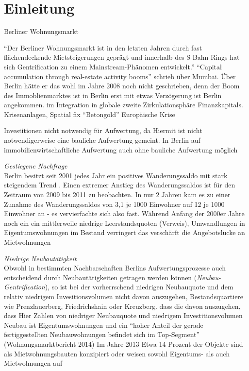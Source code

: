 \section{Einleitung}
 Berliner Wohnungsmarkt

"`Der Berliner Wohnungsmarkt ist in den letzten Jahren durch fast flächendeckende Mietsteigerungen geprägt und innerhalb des S-Bahn-Rings hat sich Gentrification zu einem Mainstream-Phänomen entwickelt."' \citep[S.~29]{Berner2015}
"`Capital accumulation through real-estate activity booms"' schrieb \citet[S.~35]{Harvey2008} über Mumbai. Über Berlin hätte er das wohl im Jahre 2008 noch nicht geschrieben, denn der Boom des Immoblienmarktes ist in Berlin erst mit etwas Verzögerung ist Berlin angekommen. im Integration in globale zweite Zirkulationsphäre Finanzkapitals. Krisenanlagen, Spatial fix "`Betongold"' Europäische Krise 

Investitionen nicht notwendig für Aufwertung, da 
Hiermit ist nicht notwendigerweise eine bauliche Aufwertung gemeint. In Berlin auf immobilienwirtschaftliche Aufwertung auch ohne bauliche Aufwertung möglich \citep[S.~30]{Berner2015} 

 \item \textit{Gestiegene Nachfrage} \\
  Berlin besitzt seit 2001 jedes Jahr ein positives Wanderungssaldo mit stark steigendem Trend \citep{StatistischesLandesamtSachsen-Anhalt2015}. Einen extremer Anstieg des Wanderungssaldos ist für den Zeitraum von 2009 bis 2011 zu beobachten. In nur 2 Jahren kam es zu einer Zunahme des Wanderungssaldos von 3,1 je 1000 Einwohner auf 12 je 1000 Einwohner an - es vervierfachte sich also fast. Während Anfang der 2000er Jahre noch ein ein mittlerweile niedrige Leerstandsquoten (Verweis), Umwandlungen in Eigentumswohnungen im Bestand verringert das verschärft die Angebotslücke an Mietwohnungen
  \item \textit{Niedrige Neubautätigkeit}\\
    Obwohl in bestimmten Nachbarschaften Berlins Aufwertungsprozesse auch entscheidend durch Neubautätigkeiten getragen werden können (\textit{Neubau-Gentrification}), so ist bei der vorherrschend niedrigen Neubauquote und dem relativ niedrigem Invesitionsvolumen nicht davon auszugehen, Bestandsquartiere wie Prenzlauerberg, Friedrichshain oder Kreuzberg.  dass die davon auszugehen, dass Hier Zahlen von niedriger Neubauquote und niedrigem Investitionsvolumen 
   Neubau ist Eigentumswohnungen und ein "`hoher Anteil der gerade fertiggestellten Neubauwohnungen befindet sich im Top-Segment"' (Wohnungsmarktbericht 2014) Im Jahre 2013 
   Etwa 14 Prozent der Objekte sind als Mietwohnungsbauten konzipiert oder weisen sowohl Eigentums- als auch Mietwohnungen auf


